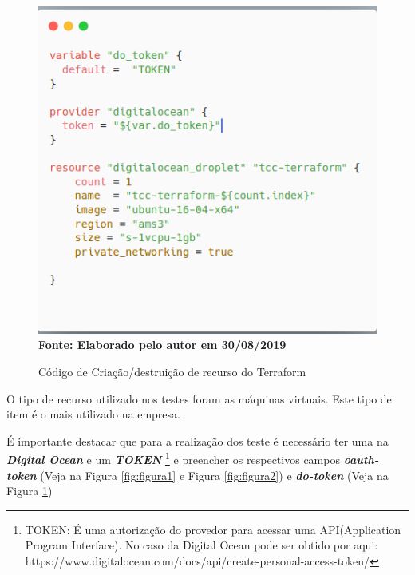 \begin{figure}[H]
	\centering	
	\caption[\hspace{0.1cm} Código de Criação/destruição de recurso do Terraform]{Código de Criação/destruição de recurso do Terraform}
	\vspace{-0.4cm}
	\includegraphics[width=1.0\textwidth]{artigo/figuras/terraform_resource.png}
	 \vspace{-0.2cm}
	\\\textbf{\footnotesize Fonte: Elaborado pelo autor em 30/08/2019}
	\label{fig:figura3}
\end{figure}
\vspace{-0.5cm}

 O tipo de recurso utilizado nos testes foram as máquinas virtuais. Este tipo de item é o mais utilizado na empresa.
 
 É importante destacar que para a realização dos teste é necessário ter uma na \textbf{\textit{Digital Ocean}} e um \textbf{\textit{TOKEN}} \footnote{TOKEN: É uma autorização do provedor para acessar uma API(Application Program Interface). No caso da Digital Ocean pode ser obtido por aqui: https://www.digitalocean.com/docs/api/create-personal-access-token/  }  e preencher os respectivos campos \textbf{\textit{oauth-token}} (Veja na Figura \ref{fig:figura1} e Figura \ref{fig:figura2}) e \textbf{\textit{do-token}} (Veja na Figura \ref{fig:figura3})
 
